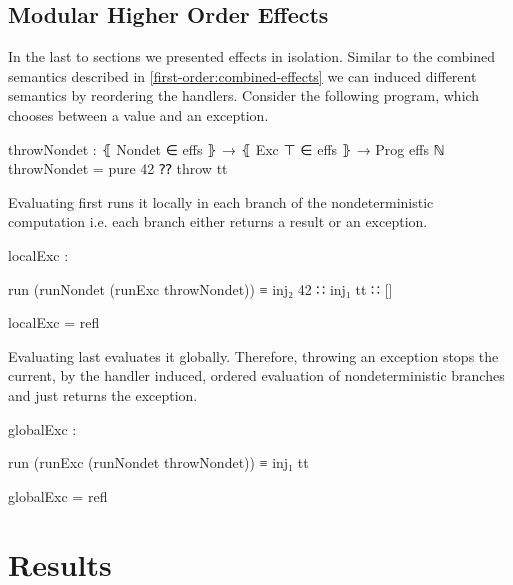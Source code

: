 \subsection{Modular Higher Order Effects}

In the last to sections we presented effects in isolation.
Similar to the combined semantics described in
\ref{first-order:combined-effects} we can induced different semantics by
reordering the handlers.
Consider the following program, which chooses between a
 value and an exception.

\begin{code}
throwNondet : ⦃ Nondet ∈ effs ⦄ → ⦃ Exc ⊤ ∈ effs ⦄ → Prog effs ℕ
throwNondet = pure 42 ⁇ throw tt
\end{code}
Evaluating  first runs it locally in each branch of the
nondeterministic computation i.e. each branch either returns a result or an
exception. 
\begin{center}
\begin{code}
localExc : 
\end{code}
\begin{code}[inline]
 run (runNondet (runExc throwNondet)) ≡ inj₂ 42 ∷ inj₁ tt ∷ []
\end{code}
\begin{code}
localExc = refl
\end{code}
\end{center}
Evaluating  last evaluates it globally.
Therefore, throwing an exception stops the current, by the 
handler induced, ordered evaluation of nondeterministic branches and just
returns the exception.
\begin{center}
\begin{code}
globalExc : 
\end{code}
\begin{code}[inline]
 run (runExc (runNondet throwNondet)) ≡ inj₁ tt
\end{code}
\begin{code}
globalExc = refl
\end{code}
\end{center}


\section{Results}

